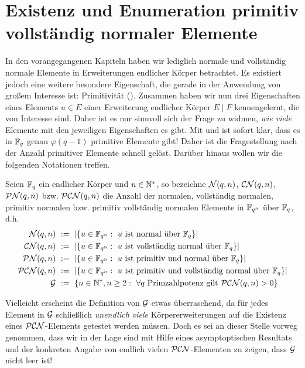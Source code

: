 \chapter{Existenz und Enumeration primitiv vollständig normaler Elemente}

In den vorangegangenen Kapiteln haben wir lediglich normale und vollständig
normale Elemente in Erweiterungen endlicher Körper betrachtet. Es existiert
jedoch eine weitere besondere Eigenschaft, die gerade in der Anwendung von
großem Interesse ist: Primitivität (). Zusammen haben wir
nun drei Eigenschaften eines Elements $u \in E$ einer Erweiterung endlicher
Körper $E\mid F$ kennengelernt, die von Interesse sind. Daher ist es nur
sinnvoll sich der Frage zu widmen, \emph{wie viele} Elemente mit den jeweiligen
Eigenschaften es gibt. Mit  und 
 ist sofort klar, dass es in
$\F_q$ genau $\varphi(q-1)$ primitive Elemente gibt! Daher ist die
Fragestellung nach der Anzahl primitiver Elemente schnell gelöst. Darüber
hinaus wollen wir die folgenden Notationen treffen.

\begin{definition}
  Seien $\F_q$ ein endlicher Körper und $n \in \N^\ast$, so bezeichne
  $\cal N(q,n)$, $\CN(q,n)$, $\PN(q,n)$ bzw. $\PCN(q,n)$ die Anzahl der 
  normalen, vollständig normalen, primitiv normalen bzw. primitiv vollständig
  normalen Elemente in $\F_{q^n}$ über $\F_q$, d.h.
  \begin{align*}
    \cal N(q,n) &\speq{:=} 
      |\{ u \in \F_{q^n}:\ u\text{ ist normal über }\F_q\}| \\
    \CN(q,n) &\speq{:=} 
      |\{ u \in \F_{q^n}:\ u\text{ ist vollständig normal über }\F_q\}| \\
    \PN(q,n) &\speq{:=} 
      |\{ u \in \F_{q^n}:\ u\text{ ist primitiv und normal über }\F_q\}| \\
    \PCN(q,n) &\speq{:=} 
      |\{ u \in \F_{q^n}:\ u\text{ ist primitiv und vollständig 
      normal über }\F_q\}| \\
    \G &\speq{:=} 
      \{ n\in \N^\ast, n\geq 2:\ 
      \forall q\text{ Primzahlpotenz gilt } \PCN(q,n) > 0 \}
  \end{align*}
\end{definition}

Vielleicht erscheint die Definition von $\G$ etwas überraschend, da für jedes
Element in $\G$ schließlich \emph{unendlich viele} Körpererweiterungen auf die
Existenz eines $\PCN$-Elements getestet werden müssen. Doch es sei an dieser
Stelle vorweg genommen, dass wir in der Lage sind mit Hilfe eines
asymptoptischen Resultats und der konkreten Angabe von endlich vielen
$\PCN$-Elementen zu zeigen, dass $\G$ nicht leer ist!

